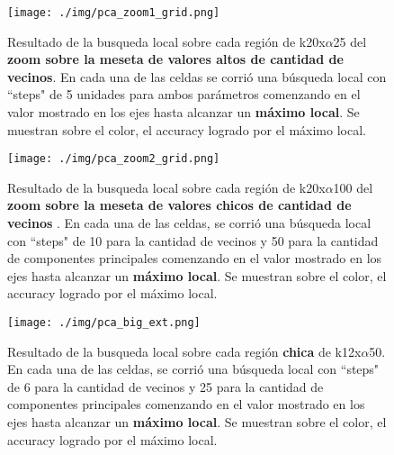 \begin{figure}[h]
    \texttt{[image: ./img/pca\_zoom1\_grid.png]}
    \centering
    \caption{Resultado de la busqueda local sobre cada región de k20x$\alpha$25 del \textbf{zoom sobre la meseta de valores altos de cantidad de vecinos}. En cada una de las celdas se corrió
    una búsqueda local con ``steps" de 5 unidades para ambos parámetros comenzando en el valor mostrado en los ejes
    hasta alcanzar un \textbf{máximo local}. Se muestran sobre el color, el accuracy logrado
    por el máximo local.}
    \label{fig:pca-z1}
\end{figure}

\begin{figure}[h]
    \texttt{[image: ./img/pca\_zoom2\_grid.png]}
    \centering
    \caption{Resultado de la busqueda local sobre cada región de k20x$\alpha$100 del \textbf{zoom sobre la meseta de valores chicos de cantidad de vecinos} . En cada una de las celdas, se corrió
    una búsqueda local con ``steps" de 10 para la cantidad de vecinos y 50 para la cantidad de componentes principales comenzando en el valor mostrado en los ejes
    hasta alcanzar un \textbf{máximo local}. Se muestran sobre el color, el accuracy logrado
    por el máximo local.}
    \label{fig:pca-z2}
\end{figure}

\begin{figure}[h]
  \texttt{[image: ./img/pca\_big\_ext.png]}
  \centering
  \caption{Resultado de la busqueda local sobre cada región
    \textbf{chica} de k12x$\alpha$50. En cada una de las celdas, se corrió
    una búsqueda local con ``steps" de 6 para la cantidad de vecinos y 25 para la cantidad de componentes principales comenzando en el valor mostrado en los ejes
    hasta alcanzar un \textbf{máximo local}. Se muestran sobre el color, el accuracy logrado
    por el máximo local.}
    \label{fig:pca-small}
\end{figure}
